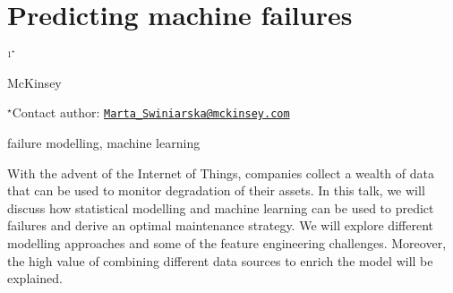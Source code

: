 \documentclass[\main/boa.tex]{subfiles}
\begin{document}
\section{Predicting machine failures}

\begin{center}
  {\bf {}$^{1^\star}$}
\end{center}

\vskip 0.3cm

\begin{affiliations}
\begin{enumerate}
\begin{minipage}{0.915\textwidth}
\centering
\item McKinsey \\[-2pt]
\end{minipage}
\end{enumerate}
$^\star$Contact author: \href{mailto:Marta_Swiniarska@mckinsey.com}{\nolinkurl{Marta\_Swiniarska@mckinsey.com}}\\
\end{affiliations}

\vskip 0.5cm

\begin{minipage}{0.915\textwidth}
\keywords failure modelling, machine learning
\end{minipage}

\vskip 0.8cm

With the advent of the Internet of Things, companies collect a wealth of
data that can be used to monitor degradation of their assets. In this
talk, we will discuss how statistical modelling and machine learning can
be used to predict failures and derive an optimal maintenance strategy.
We will explore different modelling approaches and some of the feature
engineering challenges. Moreover, the high value of combining different
data sources to enrich the model will be explained.
\end{document}
